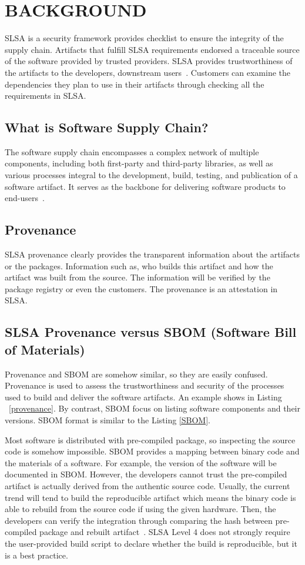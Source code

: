 \section{BACKGROUND}
SLSA is a security framework provides checklist to ensure the integrity of the supply chain.
Artifacts that fulfill SLSA requirements endorsed a traceable source of the software provided
by trusted providers. SLSA provides trustworthiness of the artifacts to the developers, downstream users~\cite{slsa2023}. 
Customers can examine the dependencies they plan to use in their artifacts through checking all the requirements in SLSA.

\subsection{What is Software Supply Chain?}
The software supply chain encompasses a complex network of multiple components, including both first-party and third-party libraries, 
as well as various processes integral to the development, build, testing, and publication of a software artifact. 
It serves as the backbone for delivering software products to end-users~\cite{DoDDefCI/CD2023}.

\subsection{Provenance}
SLSA provenance clearly provides the transparent information about the artifacts or the packages.
Information such as, who builds this artifact and how the artifact was built from the source.
The information will be verified by the package registry or even the customers. The provenance
is an attestation in SLSA.

\subsection{SLSA Provenance versus SBOM (Software Bill of Materials)}
Provenance and SBOM are somehow similar, so they are easily confused. Provenance is used to 
assess the trustworthiness and security of the processes used to build and deliver the software artifacts. An example shows in Listing ~\ref{provenance}.
By contrast, SBOM focus on listing software components and their versions. SBOM format is similar to the Listing \ref{SBOM}.

Most software is distributed with pre-compiled package, so inspecting the source code is somehow impossible.
SBOM provides a mapping between binary code and the materials of a software. For example, the version of the 
software will be documented in SBOM. However, the developers cannot trust the pre-compiled artifact is actually 
derived from the authentic source code. Usually, the current trend will tend to build the reproducible artifact which
means the binary code is able to rebuild from the source code if using the given hardware. 
Then, the developers can verify the integration through comparing the hash between pre-compiled package and rebuilt artifact~\cite{ferraiuolo2022policy}.
SLSA Level 4 does not strongly require the user-provided build script to declare whether the build is reproducible, but it 
is a best practice.

